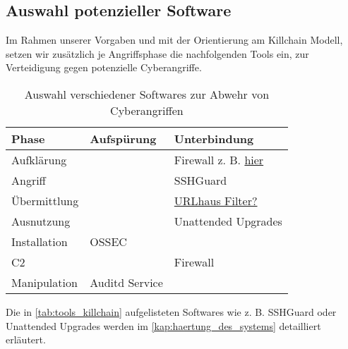 \subsection{Auswahl potenzieller Software}

Im Rahmen unserer Vorgaben und mit der Orientierung am Killchain Modell, setzen wir zusätzlich je Angriffsphase die nachfolgenden Tools ein, zur Verteidigung gegen potenzielle Cyberangriffe.

\begin{table}[]
    \begin{center}
        \begin{tabular}{|l|l|l|}
            \hline
            Phase        & Aufspürung     & Unterbindung        \\ \hline
            Aufklärung   &                & Firewall z. B. \href{https://feodotracker.abuse.ch/blocklist/}{hier}            \\ \hline
            Angriff      &                & SSHGuard            \\ \hline
            Übermittlung &                & \href{https://gitlab.com/malware-filter/urlhaus-filter}{URLhaus Filter?}     \\ \hline
            Ausnutzung   &                & Unattended Upgrades \\ \hline
            Installation & OSSEC          &                     \\ \hline
            C2           &                & Firewall            \\ \hline
            Manipulation & Auditd Service &                     \\ \hline
        \end{tabular}
    \end{center}
    \caption{Auswahl verschiedener Softwares zur Abwehr von Cyberangriffen}
    \label{tab:tools_killchain}
\end{table}

Die in \autoref{tab:tools_killchain} aufgelisteten Softwares wie z. B. SSHGuard oder Unattended Upgrades werden im \autoref{kap:haertung_des_systems} detailliert erläutert.